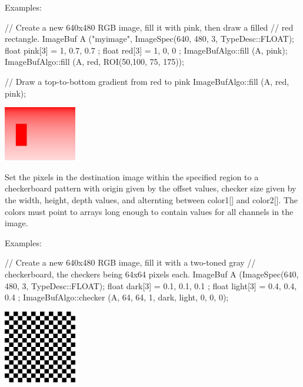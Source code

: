 \smallskip
\noindent Examples:
\begin{code}
    // Create a new 640x480 RGB image, fill it with pink, then draw a filled
    // red rectangle.
    ImageBuf A ("myimage", ImageSpec(640, 480, 3, TypeDesc::FLOAT);
    float pink[3] = { 1, 0.7, 0.7 };
    float red[3] = { 1, 0, 0 };
    ImageBufAlgo::fill (A, pink);
    ImageBufAlgo::fill (A, red, ROI(50,100, 75, 175));

    // Draw a top-to-bottom gradient from red to pink
    ImageBufAlgo::fill (A, red, pink);
\end{code}
\spc \includegraphics[width=1.25in]{figures/fill.jpg}  \\
\apiend


 
Set the pixels in the destination image within the specified region
to a checkerboard pattern with origin given by the {\cf offset} values,
checker size given by the {\cf width, height, depth} values, and 
alternting between {\cf color1[]} and {\cf color2[]}.  The colors must
point to arrays long enough to contain values for all channels in the
image.

\smallskip
\noindent Examples:
\begin{code}
    // Create a new 640x480 RGB image, fill it with a two-toned gray
    // checkerboard, the checkers being 64x64 pixels each.
    ImageBuf A (ImageSpec(640, 480, 3, TypeDesc::FLOAT);
    float dark[3] = { 0.1, 0.1, 0.1 };
    float light[3] = { 0.4, 0.4, 0.4 };
    ImageBufAlgo::checker (A, 64, 64, 1, dark, light, 0, 0, 0);
\end{code}
\spc \includegraphics[width=1.25in]{figures/checker.jpg}  \\
\apiend


